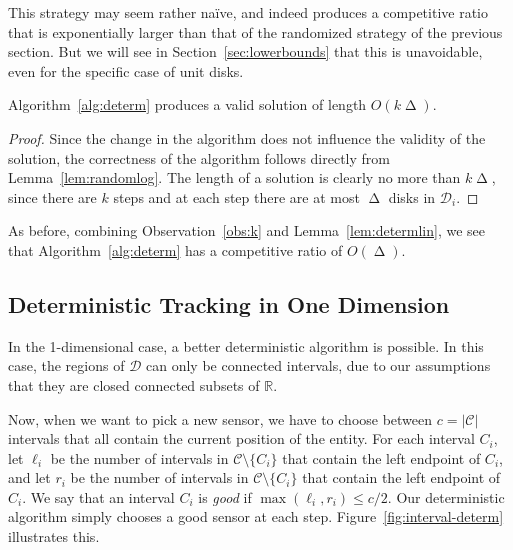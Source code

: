 \documentclass[runningheads]{llncs}
\newcommand {\mathset} [1] {\ensuremath {\mathbb {#1}}}
\newcommand {\R} {\mathset {R}}
\newcommand {\script} [1] {\ensuremath {\mathcal {#1}}}
\DeclareMathOperator {\ply}{\Delta}
\begin{document}
         
      This strategy may seem rather na\"ive, and indeed produces a competitive ratio that is exponentially larger than that of the randomized strategy of the previous section. But we will see in Section~\ref {sec:lowerbounds} that this is unavoidable, even for the specific case of unit disks.
      
      \begin {lemma} \label {lem:determlin}
        Algorithm~\ref {alg:determ} produces a valid solution of length $O (k \ply)$.
      \end {lemma}
      
      \begin {proof}
        Since the change in the algorithm does not influence the validity of the solution, the correctness of the algorithm follows directly from Lemma~\ref {lem:randomlog}.
        The length of a solution is clearly no more than $k \ply$, since there are $k$ steps and at each step there are at most $\ply$ disks in $\script D_i$.
      \end {proof}

      As before, combining Observation~\ref {obs:k} and Lemma~\ref {lem:determlin}, we see that Algorithm~\ref {alg:determ} has a competitive ratio of $O (\ply)$.
       
 \subsection {Deterministic Tracking in One Dimension}
In the 1-dimensional case, a better deterministic algorithm is possible. In this case, the regions of $\script D$ can only be connected intervals, due to our assumptions that they are closed connected subsets of $\R$.
            
Now, when we want to pick a new sensor, we have to choose between $c=|\script C|$ intervals that all contain the current position of the entity. For each interval $C_i$, let $\ell_i$ be the number of intervals in $\script C\setminus\{C_i\}$ that contain the left endpoint of $C_i$, and let $r_i$ be the number of intervals in $\script C\setminus\{C_i\}$ that contain the left endpoint of $C_i$. We say that an interval $C_i$ is \emph{good} if $\max(\ell_i,r_i)\le c/2$. Our deterministic algorithm simply chooses a good sensor at each step. Figure~\ref {fig:interval-determ} illustrates this.
      
\end{document}
